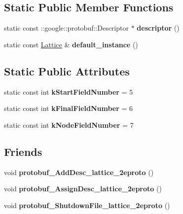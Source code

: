 \subsection*{Static Public Member Functions}
\begin{DoxyCompactItemize}
\item 
\hypertarget{classlattice_1_1Lattice_a1439fffc17a145ba6bede8f9c693989e}{
static const ::google::protobuf::Descriptor $\ast$ {\bfseries descriptor} ()}
\label{classlattice_1_1Lattice_a1439fffc17a145ba6bede8f9c693989e}

\item 
\hypertarget{classlattice_1_1Lattice_ad46beb148ef5b77a4653a17ab5eff0b8}{
static const \hyperlink{classlattice_1_1Lattice}{Lattice} \& {\bfseries default\_\-instance} ()}
\label{classlattice_1_1Lattice_ad46beb148ef5b77a4653a17ab5eff0b8}

\end{DoxyCompactItemize}
\subsection*{Static Public Attributes}
\begin{DoxyCompactItemize}
\item 
\hypertarget{classlattice_1_1Lattice_a43c82461b5757da3dec815f9a1918546}{
static const int {\bfseries kStartFieldNumber} = 5}
\label{classlattice_1_1Lattice_a43c82461b5757da3dec815f9a1918546}

\item 
\hypertarget{classlattice_1_1Lattice_a41954f413ffb07063a80fb779f7b825b}{
static const int {\bfseries kFinalFieldNumber} = 6}
\label{classlattice_1_1Lattice_a41954f413ffb07063a80fb779f7b825b}

\item 
\hypertarget{classlattice_1_1Lattice_aef2900e37da8f683285328c24b5e6b16}{
static const int {\bfseries kNodeFieldNumber} = 7}
\label{classlattice_1_1Lattice_aef2900e37da8f683285328c24b5e6b16}

\end{DoxyCompactItemize}
\subsection*{Friends}
\begin{DoxyCompactItemize}
\item 
\hypertarget{classlattice_1_1Lattice_a19e63fb37025879e023cad88064187cf}{
void {\bfseries protobuf\_\-AddDesc\_\-lattice\_\-2eproto} ()}
\label{classlattice_1_1Lattice_a19e63fb37025879e023cad88064187cf}

\item 
\hypertarget{classlattice_1_1Lattice_a3b0386e09a9fefcf1bdce658cfc480b2}{
void {\bfseries protobuf\_\-AssignDesc\_\-lattice\_\-2eproto} ()}
\label{classlattice_1_1Lattice_a3b0386e09a9fefcf1bdce658cfc480b2}

\item 
\hypertarget{classlattice_1_1Lattice_a3c7b187721d0704ceb19ff889729d35a}{
void {\bfseries protobuf\_\-ShutdownFile\_\-lattice\_\-2eproto} ()}
\label{classlattice_1_1Lattice_a3c7b187721d0704ceb19ff889729d35a}

\end{DoxyCompactItemize}


